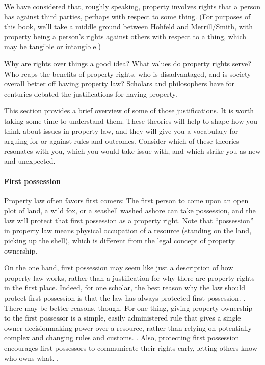 
We have considered that, roughly speaking, property involves rights that a
person has against third parties, perhaps with respect to some thing. (For
purposes of this book, we'll take a middle ground between Hohfeld and
Merrill/Smith, with property being a person's rights against others with respect
to a thing, which may be tangible or intangible.)

Why are rights over things a good idea? What values do property rights serve?
Who reaps the benefits of property rights, who is disadvantaged, and is society
overall better off having property law? Scholars and philosophers have for
centuries debated the justifications for having property.

This section provides a brief overview of some of those justifications. It is
worth taking some time to understand them. These theories will help to
shape how you think about issues in property law, and they will give you a
vocabulary for arguing for or against rules and outcomes. Consider which of
these theories resonates with you, which you would take issue with, and which
strike you as new and unexpected.





\paragraph{First possession} Property law often favors first comers: The first
person to come upon an open plot of land, a wild fox, or a seashell washed
ashore can take possession, and the law will protect that first possession as a
property right. Note that ``possession'' in property law means physical
occupation of a resource (standing on the land, picking up the shell), which is
different from the legal concept of property ownership.

On the one hand, first possession may seem like just a description of how
property law works, rather than a justification for why there are property
rights in the first place. Indeed, for one scholar, the best reason why the law
should protect first possession is that the law has always protected first
possession. . There may be
better reasons, though. For one thing, giving property ownership to the first
possessor is a simple, easily administered rule that gives a single owner
decisionmaking power over a resource, rather than relying on potentially complex
and changing rules and customs. . Also, protecting first possession encourages first possessors to
communicate their rights early, letting others know who owns what. .


